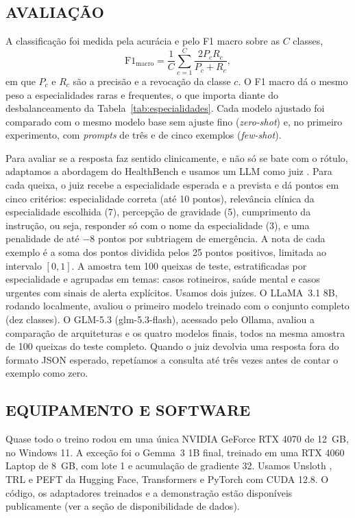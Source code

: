 \documentclass{ieeeaccess}
\begin{document}
\subsection{AVALIA\c{C}\~AO}
\label{sec:avaliacao}
A classifica\c{c}\~ao foi medida pela acur\'acia e pelo F1 macro sobre as $C$ classes,
\begin{equation}
\mathrm{F1}_{\mathrm{macro}} = \frac{1}{C}\sum_{c=1}^{C}\frac{2P_{c}R_{c}}{P_{c}+R_{c}},
\label{eq:f1}
\end{equation}
em que $P_{c}$ e $R_{c}$ s\~ao a precis\~ao e a revoca\c{c}\~ao da classe $c$. O F1 macro d\'a o mesmo peso a especialidades raras e frequentes, o que importa diante do desbalanceamento da Tabela~\ref{tab:especialidades}. Cada modelo ajustado foi comparado com o mesmo modelo base sem ajuste fino (\emph{zero-shot}) e, no primeiro experimento, com \emph{prompts} de tr\^es e de cinco exemplos (\emph{few-shot}).

Para avaliar se a resposta faz sentido clinicamente, e n\~ao s\'o se bate com o r\'otulo, adaptamos a abordagem do HealthBench \cite{b20} e usamos um LLM como juiz \cite{b19}. Para cada queixa, o juiz recebe a especialidade esperada e a prevista e d\'a pontos em cinco crit\'erios: especialidade correta (at\'e 10 pontos), relev\^ancia cl\'inica da especialidade escolhida (7), percep\c{c}\~ao de gravidade (5), cumprimento da instru\c{c}\~ao, ou seja, responder s\'o com o nome da especialidade (3), e uma penalidade de at\'e $-8$ pontos por subtriagem de emerg\^encia. A nota de cada exemplo \'e a soma dos pontos dividida pelos 25 pontos positivos, limitada ao intervalo $[0, 1]$. A amostra tem 100 queixas de teste, estratificadas por especialidade e agrupadas em temas: casos rotineiros, sa\'ude mental e casos urgentes com sinais de alerta expl\'icitos. Usamos dois ju\'izes. O LLaMA~3.1 8B, rodando localmente, avaliou o primeiro modelo treinado com o conjunto completo (dez classes). O GLM-5.3 (glm-5.3-flash), acessado pelo Ollama, avaliou a compara\c{c}\~ao de arquiteturas e os quatro modelos finais, todos na mesma amostra de 100 queixas do teste completo. Quando o juiz devolvia uma resposta fora do formato JSON esperado, repet\'iamos a consulta at\'e tr\^es vezes antes de contar o exemplo como zero.

\subsection{EQUIPAMENTO E SOFTWARE}
Quase todo o treino rodou em uma \'unica NVIDIA GeForce RTX 4070 de 12~GB, no Windows 11. A exce\c{c}\~ao foi o Gemma~3 1B final, treinado em uma RTX 4060 Laptop de 8~GB, com lote 1 e acumula\c{c}\~ao de gradiente 32. Usamos Unsloth \cite{b21}, TRL \cite{b22} e PEFT da Hugging Face, Transformers e PyTorch com CUDA 12.8. O c\'odigo, os adaptadores treinados e a demonstra\c{c}\~ao est\~ao dispon\'iveis publicamente (ver a se\c{c}\~ao de disponibilidade de dados).
\end{document}
